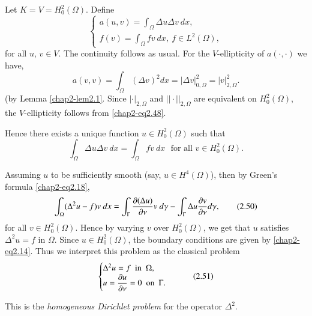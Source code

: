 \begin{example}\label{chap2-exam2.4}
Let $K=V=H^{2}_{0}(\Omega)$. Define 
\begin{equation*}
\begin{cases}
a(u,v)=\int_{\Omega}\Delta u\Delta v\ dx,\\
f(v)=\int_{\Omega}fv\ dx,\ f\in L^{2}(\Omega),
\end{cases}\tag{2.47}\label{chap2-eq2.47}
\end{equation*}\pageoriginale
for all $u$, $v\in V$. The continuity follows as usual. For the
$V$-ellipticity of $a(\cdot,\cdot)$ we have,
\begin{equation*}
a(v,v)=\int_{\Omega}(\Delta v)^{2}dx=|\Delta
v|^{2}_{0,\Omega}=|v|^{2}_{2,\Omega}.\tag{2.48}\label{chap2-eq2.48} 
\end{equation*}
(by Lemma \ref{chap2-lem2.1}. Since $|\cdot|_{2,\Omega}$ and $||\cdot
||_{2,\Omega}$ are equivalent on $H^{2}_{0}(\Omega)$, the
$V$-ellipticity follows from \eqref{chap2-eq2.48}.

Hence there exists a unique function $u\in H^{2}_{0}(\Omega)$ such
that
\begin{equation*}
\int_{\Omega}\Delta u\Delta v\ dx=\int_{\Omega}fv\ dx\text{~ for all~
} v\in H^{2}_{0}(\Omega).
\end{equation*}

Assuming $u$ to be sufficiently smooth (say, $u\in H^{4}(\Omega)$),
then by Green's formula \eqref{chap2-eq2.18},
\begin{equation*}
\int_{\Omega}(\Delta^{2}u-f)v\ dx=\int_{\Gamma}\frac{\p (\Delta u)}{\p
  \nu}v\ d\gamma-\int_{\Gamma}\Delta u\frac{\p v}{\p
  \nu}d\gamma,\tag{2.50}\label{chap2-eq2.50} 
\end{equation*}
for all $v\in H^{2}_{0}(\Omega)$. Hence by varying $v$ over
$H^{2}_{0}(\Omega)$, we get that $u$ satisfies $\Delta^{2}u=f$ in
$\Omega$. Since $u\in H^{2}_{0}(\Omega)$, the boundary conditions are
given by \eqref{chap2-eq2.14}. Thus we interpret this problem as the
classical problem
\begin{equation*}
\begin{cases}
\Delta^{2}u=f\text{~ in~ }\Omega,\\
u=\dfrac{\partial u}{\partial \nu}= 0\text{~ on~ }\Gamma.
\end{cases}\tag{2.51}\label{chap2-eq2.51}
\end{equation*}

This is the {\em homogeneous Dirichlet problem} for the operator
$\Delta^{2}$. 


\end{example}

